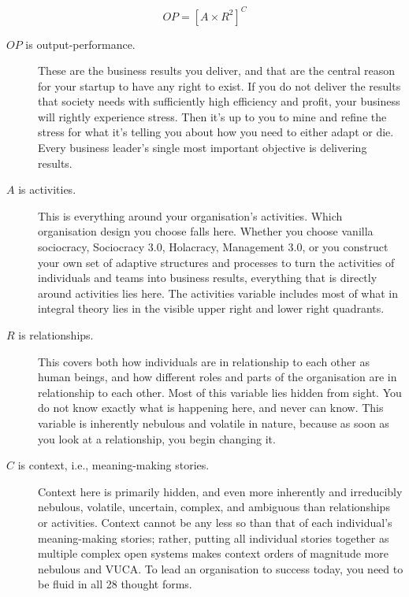 \begin{equation}
        OP = [ A \times R^{2} ]^C
\label{eq:living-organisation}
\end{equation}


\begin{description}
\item[$OP$ is output-performance.] These are the business results you deliver, and that are the central reason for your startup to have any right to exist. If you do not deliver the results that society needs with sufficiently high efficiency and profit, your business will rightly experience stress. Then it's up to you to mine and refine the stress for what it's telling you about how you need to either adapt or die. Every business leader's single most important objective is delivering results.


\item[$A$ is activities.] This is everything around your organisation’s activities. Which organisation design you choose falls here. Whether you choose vanilla sociocracy, Sociocracy 3.0, Holacracy, Management 3.0, or you construct your own set of adaptive structures and processes to turn the activities of individuals and teams into business results, everything that is directly around activities lies here. The activities variable includes most of what in integral theory lies in the visible upper right and lower right quadrants. 


\item[$R$ is relationships.] This covers both how individuals are in relationship to each other as human beings, and how different roles and parts of the organisation are in relationship to each other. Most of this variable lies hidden from sight. You do not know exactly what is happening here, and never can know. This variable is inherently nebulous and volatile in nature, because as soon as you look at a relationship, you begin changing it.


\item[$C$ is context, i.e., meaning\hyp{}making stories.] Context here is primarily hidden, and even more inherently and irreducibly nebulous, volatile, uncertain, complex, and ambiguous than relationships or activities. Context cannot be any less so than that of each individual's meaning\hyp{}making stories; rather, putting all individual stories together as multiple complex open systems makes context orders of magnitude more nebulous and VUCA. To lead an organisation to success today, you need to be fluid in all 28 thought forms.
\end{description}


